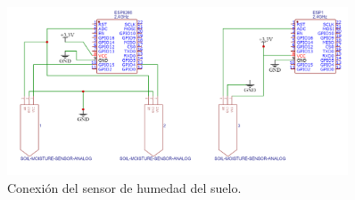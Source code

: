 \begin{figure}[!h]
	\centering
	\includegraphics[width=0.9\textwidth]{./Figures/soil_schematic.png}
	\caption[Conexión del sensor de humedad del suelo]{Conexión del sensor de humedad del suelo.}
	\label{fig:soilschem}
\end{figure}


